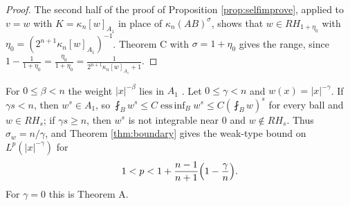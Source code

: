 \begin{proof}
The second half of the proof of Proposition \ref{prop:selfimprove}, applied to $v=w$ with
$K=\kappa_n[w]_{A_1}$ in place of $\kappa_n(AB)^\sigma$, shows that $w\in RH_{1+\eta_0}$ with
$\eta_0=(2^{n+1}\kappa_n[w]_{A_1})^{-1}$. Theorem C with
$\sigma=1+\eta_0$ gives the range, since $1-\frac1{1+\eta_0}=\frac{\eta_0}{1+\eta_0}
=\frac1{2^{n+1}\kappa_n[w]_{A_1}+1}$.
\end{proof}

\begin{example}\label{ex:powerweight}
For $0\le\beta<n$ the weight $|x|^{-\beta}$ lies in $A_1$ \cite[\S7.1]{Gra14}. Let $0\le\gamma<n$ and
$w(x)=|x|^{-\gamma}$. If $\gamma s<n$, then $w^s\in A_1$, so
$\fint_Bw^s\le C\operatorname*{ess\,inf}_Bw^s\le C(\fint_Bw)^s$ for every ball and $w\in RH_s$; if
$\gamma s\ge n$, then $w^s$ is not integrable near $0$ and $w\notin RH_s$. Thus $\sigma_w=n/\gamma$, and
Theorem \ref{thm:boundary} gives the weak-type bound on $L^p(|x|^{-\gamma})$ for
\[
1<p<1+\frac{n-1}{n+1}\Bigl(1-\frac\gamma n\Bigr).
\]
For $\gamma=0$ this is Theorem A.
\end{example}
